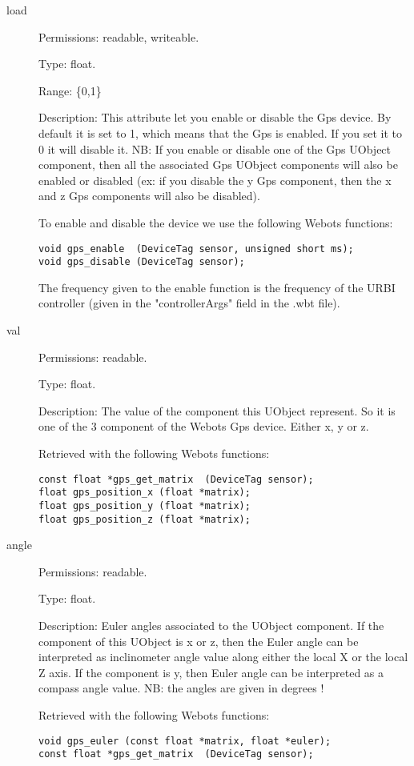 \noindent
\begin{description}
\item[{load}]     Permissions: readable, writeable.


  Type: float.


  Range: \{0,1\}


  Description: This attribute let you enable or disable the Gps
  device.  By default it is set to 1, which means that the Gps is
  enabled. If you set it to 0 it will disable it. NB: If you enable or
  disable one of the Gps UObject component, then all the associated
  Gps UObject components will also be enabled or disabled (ex: if you
  disable the y Gps component, then the x and z Gps components will
  also be disabled).


  To enable and disable the device we use the following Webots
  functions:


\begin{lstlisting}[firstnumber=1,]
void gps_enable  (DeviceTag sensor, unsigned short ms);
void gps_disable (DeviceTag sensor);
\end{lstlisting}

The frequency given to the enable function is the frequency of the
URBI controller (given in the "controllerArgs" field in the .wbt
file).

\item[{         val
 }]            Permissions: readable.


 Type: float.


 Description: The value of the component this UObject represent. So it
 is one of the 3 component of the Webots Gps device. Either x, y or z.


 Retrieved with the following Webots functions:


\begin{lstlisting}[firstnumber=1,]
const float *gps_get_matrix  (DeviceTag sensor);
float gps_position_x (float *matrix);
float gps_position_y (float *matrix);
float gps_position_z (float *matrix);
\end{lstlisting}
\item[{         angle
 }]            Permissions: readable.


 Type: float.


 Description: Euler angles associated to the UObject component. If the
 component of this UObject is x or z, then the Euler angle can be
 interpreted as inclinometer angle value along either the local X or
 the local Z axis. If the component is y, then Euler angle can be
 interpreted as a compass angle value. NB: the angles are given in
 degrees !


          Retrieved with the following Webots functions:


\begin{lstlisting}[firstnumber=1,]
void gps_euler (const float *matrix, float *euler);
const float *gps_get_matrix  (DeviceTag sensor);
\end{lstlisting}
\end{description}

